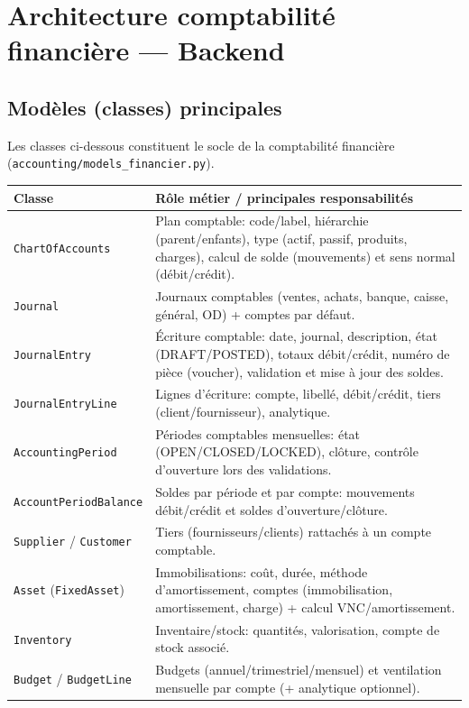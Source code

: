 \documentclass[12pt,a4paper]{article}
\begin{document}
\section{Architecture comptabilité financière --- Backend}

\subsection{Modèles (classes) principales}
Les classes ci-dessous constituent le socle de la comptabilité financière (\texttt{accounting/models\_financier.py}).

\begin{longtable}{|p{4.2cm}|p{10.2cm}|}
\hline
\textbf{Classe} & \textbf{Rôle métier / principales responsabilités} \\ \hline
\texttt{ChartOfAccounts} & Plan comptable: code/label, hiérarchie (parent/enfants), type (actif, passif, produits, charges), calcul de solde (mouvements) et sens normal (débit/crédit). \\ \hline
\texttt{Journal} & Journaux comptables (ventes, achats, banque, caisse, général, OD) + comptes par défaut. \\ \hline
\texttt{JournalEntry} & Écriture comptable: date, journal, description, état (DRAFT/POSTED), totaux débit/crédit, numéro de pièce (voucher), validation et mise à jour des soldes. \\ \hline
\texttt{JournalEntryLine} & Lignes d’écriture: compte, libellé, débit/crédit, tiers (client/fournisseur), analytique. \\ \hline
\texttt{AccountingPeriod} & Périodes comptables mensuelles: état (OPEN/CLOSED/LOCKED), clôture, contrôle d’ouverture lors des validations. \\ \hline
\texttt{AccountPeriodBalance} & Soldes par période et par compte: mouvements débit/crédit et soldes d’ouverture/clôture. \\ \hline
\texttt{Supplier} / \texttt{Customer} & Tiers (fournisseurs/clients) rattachés à un compte comptable. \\ \hline
\texttt{Asset} (\texttt{FixedAsset}) & Immobilisations: coût, durée, méthode d’amortissement, comptes (immobilisation, amortissement, charge) + calcul VNC/amortissement. \\ \hline
\texttt{Inventory} & Inventaire/stock: quantités, valorisation, compte de stock associé. \\ \hline
\texttt{Budget} / \texttt{BudgetLine} & Budgets (annuel/trimestriel/mensuel) et ventilation mensuelle par compte (+ analytique optionnel). \\ \hline

\end{longtable}
\end{document}
